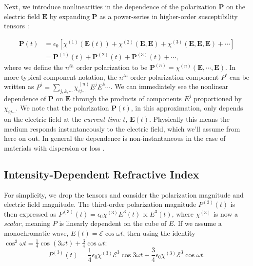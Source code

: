 \documentclass[12pt]{article}
\begin{document}
Next, we introduce nonlinearities in the dependence of the polarization $\mathbf{P}$ on the
electric field $\mathbf{E}$ by expanding $\mathbf{P}$ as a power-series in higher-order
susceptibility tensors \cite{TODO BOYD}:

\begin{align*}
  \mathbf{P}(t) &= \epsilon_0[\chi^{(1)}(\mathbf{E}(t)) + \chi^{(2)}(\mathbf{E}, \mathbf{E}) +
                  \chi^{(3)}(\mathbf{E}, \mathbf{E}, \mathbf{E}) + \cdots]\\
                &= \mathbf{P}^{(1)}(t) + \mathbf{P}^{(2)}(t) + \mathbf{P}^{(3)}(t) + \cdots,
\end{align*}
where we define the $n^{th}$ order polarization to be
$\mathbf{P}^{(n)} = \chi^{(n)}(\mathbf{E}, \cdots, \mathbf{E})$. In more typical component
notation, the $n^{th}$ order polarization component $P^i$ can be written as
$P^i = \sum_{j,k,\cdots}\chi^{(n)}_{ij\cdots}E^jE^k\cdots$. We can immediately see the
nonlinear dependence of $\mathbf{P}$ on $\mathbf{E}$ through the products of components $E^j$
proportioned by $\chi_{ij\cdots}$. We note that the polarization $\mathbf{P}(t)$, in this
approximation, only depends on the electric field at the \textit{current time $t$},
$\mathbf{E}(t)$. Physically this means the medium responds instantaneously to the electric
field, which we'll assume from here on out. In general the dependence is non-instantaneous
in the case of materials with dispersion or loss \cite{TODO BOYD}.

\subsection*{Intensity-Dependent Refractive Index}
For simplicity, we drop the tensors and consider the polarization magnitude and electric
field magnitude. The third-order polarization magnitude $P^{(3)}(t)$ is then expressed as
$P^{(3)}(t) = \epsilon_0\chi^{(3)}E^3(t)\propto E^3(t)$, where $\chi^{(3)}$ is now a
\textit{scalar}, meaning $P$ is linearly dependent on the cube of $E$. If we assume a
monochromatic wave, $E(t) = \mathcal{E} \cos \omega t$, then using the identity $\cos^3\omega
t = \frac14 \cos(3\omega t) + \frac34 \cos \omega t$:
\[ P^{(3)}(t) = \frac14 \epsilon_0\chi^{(3)}\mathcal{E}^3 \cos 3\omega t + \frac34
  \epsilon_0\chi^{(3)}\mathcal{E}^3\cos\omega t.\]
\end{document}
